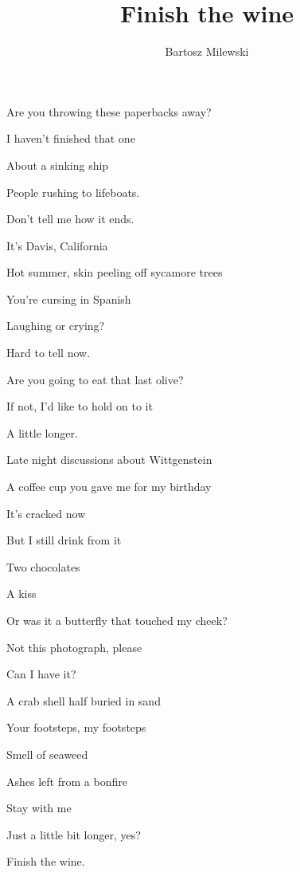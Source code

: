 \documentclass{memoir}
\author{Bartosz Milewski}
\title{Finish the wine}
\date{}
\begin{document}
\maketitle{}

Are you throwing these paperbacks away?

I haven't finished that one

About a sinking ship

People rushing to lifeboats.

Don't tell me how it ends.

\bigskip


It's Davis, California

Hot summer, skin peeling off sycamore trees

You're cursing in Spanish

Laughing or crying?

Hard to tell now.

\bigskip
Are you going to eat that last olive?

If not, I'd like to hold on to it

A little longer.

Late night discussions about Wittgenstein

A coffee cup you gave me for my birthday

It's cracked now

But I still drink from it

Two chocolates

A kiss

Or was it a butterfly that touched my cheek?

\bigskip
Not this photograph, please

Can I have it?

A crab shell half buried in sand

Your footsteps, my footsteps

Smell of seaweed

Ashes left from a bonfire

\bigskip

Stay with me

Just a little bit longer, yes?

Finish the wine.
\end{document}
